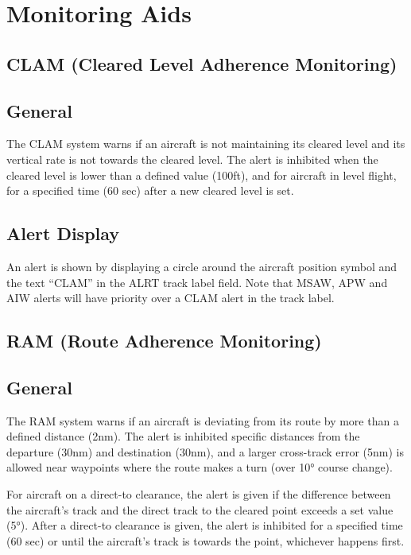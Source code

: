 \documentclass[11pt,a4paper]{memoir}
\begin{document}
\section{Monitoring Aids}

\subsection{CLAM (Cleared Level Adherence Monitoring)}

\subsection*{General}

The CLAM system warns if an aircraft is not maintaining its cleared level and its vertical rate is not towards the cleared level. The alert is inhibited when the cleared level is lower than a defined value (100ft), and for aircraft in level flight, for a specified time (60 sec) after a new cleared level is set.

\subsection*{Alert Display}

An alert is shown by displaying a circle around the aircraft position symbol and the text “CLAM” in the ALRT track label field. Note that MSAW, APW and AIW alerts will have priority over a CLAM alert in the track label.

\subsection{RAM (Route Adherence Monitoring)}

\subsection*{General}

The RAM system warns if an aircraft is deviating from its route by more than a defined distance (2nm). The alert is inhibited specific distances from the departure (30nm) and destination (30nm), and a larger cross-track error (5nm) is allowed near waypoints where the route makes a turn (over 10° course change).

For aircraft on a direct-to clearance, the alert is given if the difference between the aircraft’s track and the direct track to the cleared point exceeds a set value (5°). After a direct-to clearance is given, the alert is inhibited for a specified time (60 sec) or until the aircraft’s track is towards the point, whichever happens first.
\end{document}
